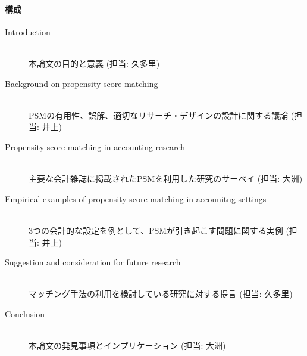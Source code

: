 \paragraph{構成}
\begin{description}
 \item[Introduction] \mbox{}\\
            本論文の目的と意義 (担当: 久多里)
 \item[Background on propensity score matching] \mbox{}\\
            PSMの有用性、誤解、適切なリサーチ・デザインの設計に関する議論 (担当: 井上)
 \item[Propensity score matching in accounting research] \mbox{}\\
            主要な会計雑誌に掲載されたPSMを利用した研究のサーベイ (担当: 大洲)
 \item[Empirical examples of propensity score matching in accounitng settings] \mbox{}\\
            3つの会計的な設定を例として、PSMが引き起こす問題に関する実例 (担当: 井上)
 \item[Suggestion and consideration for future research] \mbox{}\\
            マッチング手法の利用を検討している研究に対する提言  (担当: 久多里)
 \item[Conclusion] \mbox{}\\
            本論文の発見事項とインプリケーション  (担当: 大洲)
\end{description}





